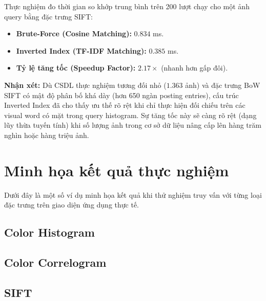 Thực nghiệm đo thời gian so khớp trung bình trên 200 lượt chạy cho một ảnh query bằng đặc trưng SIFT:
\begin{itemize}
    \item \textbf{Brute-Force (Cosine Matching):} $0.834$ ms.
    \item \textbf{Inverted Index (TF-IDF Matching):} $0.385$ ms.
    \item \textbf{Tỷ lệ tăng tốc (Speedup Factor):} $2.17\times$ (nhanh hơn gấp đôi).
\end{itemize}
\textbf{Nhận xét:} Dù CSDL thực nghiệm tương đối nhỏ ($1.363$ ảnh) và đặc trưng BoW SIFT có mật độ phân bố khá dày (hơn 650 ngàn posting entries), cấu trúc Inverted Index đã cho thấy ưu thế rõ rệt khi chỉ thực hiện đối chiếu trên các visual word có mặt trong query histogram. Sự tăng tốc này sẽ càng rõ rệt (dạng lũy thừa tuyến tính) khi số lượng ảnh trong cơ sở dữ liệu nâng cấp lên hàng trăm nghìn hoặc hàng triệu ảnh.


\section{Minh họa kết quả thực nghiệm}
Dưới đây là một số ví dụ minh họa kết quả khi thử nghiệm truy vấn với từng loại đặc trưng trên giao diện ứng dụng thực tế.

\subsection{Color Histogram}

\subsection{Color Correlogram}

\subsection{SIFT}

